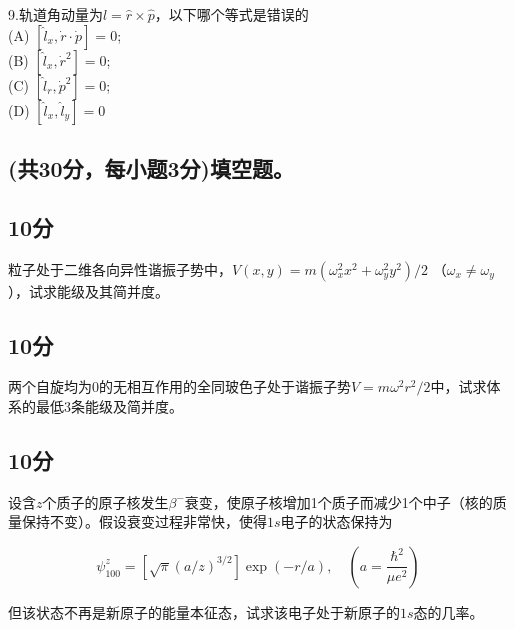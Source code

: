 9.轨道角动量为$\hat{l}=\hat{r}\times \hat{p}$，以下哪个等式是错误的\\
   (A) $[\hat{l}_x, \dot{r} \cdot \dot{p}] = 0$; \\
   (B) $[\hat{l}_x, \dot{r}^2] = 0$; \\
   (C) $[\hat{l}_r, \dot{p}^2] = 0$; \\
   (D) $[\hat{l}_x, \hat{l}_y] = 0$\\

\subsection{(共30分，每小题3分)填空题。}
\subsection{10分}
粒子处于二维各向异性谐振子势中，$V(x, y) = m(\omega_x^2 x^2 + \omega_y^2 y^2)/2$ （$\omega_x \neq \omega_y$），试求能级及其简并度。
\subsection{10分}
两个自旋均为0的无相互作用的全同玻色子处于谐振子势$V = m\omega^2 r^2 / 2$中，试求体系的最低3条能级及简并度。
\subsection{10分}
设含$z$个质子的原子核发生$\beta^-$衰变，使原子核增加1个质子而减少1个中子（核的质量保持不变）。假设衰变过程非常快，使得$1s$电子的状态保持为

    \[
    \psi^z_{100} = \left[ \sqrt{\pi}(a/z)^{3/2} \right] \exp(-r/a), \quad (a = \frac{\hbar^2}{\mu e^2})~
    \]

    但该状态不再是新原子的能量本征态，试求该电子处于新原子的$1s$态的几率。